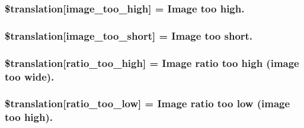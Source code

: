 \subsubsection[{\$translation}]{\setlength{\rightskip}{0pt plus 5cm}\$translation\mbox{[}\textquotesingle{}image\+\_\+too\+\_\+high\textquotesingle{}\mbox{]} = \textquotesingle{}Image too high.\textquotesingle{}}\label{class_8upload_8xx___x_x_8php_aa27bde361343f3b63c7cd441860024f8}
\hypertarget{class_8upload_8xx___x_x_8php_a86fcd4e1157b00032df451188d735527}{}
\subsubsection[{\$translation}]{\setlength{\rightskip}{0pt plus 5cm}\$translation\mbox{[}\textquotesingle{}image\+\_\+too\+\_\+short\textquotesingle{}\mbox{]} = \textquotesingle{}Image too short.\textquotesingle{}}\label{class_8upload_8xx___x_x_8php_a86fcd4e1157b00032df451188d735527}
\hypertarget{class_8upload_8xx___x_x_8php_a23396f6ce7f31e5e5f1b57580621d982}{}
\subsubsection[{\$translation}]{\setlength{\rightskip}{0pt plus 5cm}\$translation\mbox{[}\textquotesingle{}ratio\+\_\+too\+\_\+high\textquotesingle{}\mbox{]} = \textquotesingle{}Image ratio too high (image too wide).\textquotesingle{}}\label{class_8upload_8xx___x_x_8php_a23396f6ce7f31e5e5f1b57580621d982}
\hypertarget{class_8upload_8xx___x_x_8php_ac533b9a479f056b0b8623e4268f068c2}{}
\subsubsection[{\$translation}]{\setlength{\rightskip}{0pt plus 5cm}\$translation\mbox{[}\textquotesingle{}ratio\+\_\+too\+\_\+low\textquotesingle{}\mbox{]} = \textquotesingle{}Image ratio too low (image too high).\textquotesingle{}}\label{class_8upload_8xx___x_x_8php_ac533b9a479f056b0b8623e4268f068c2}
\hypertarget{class_8upload_8xx___x_x_8php_aa4051ef64e94a3f8295c63cf85544016}{}
